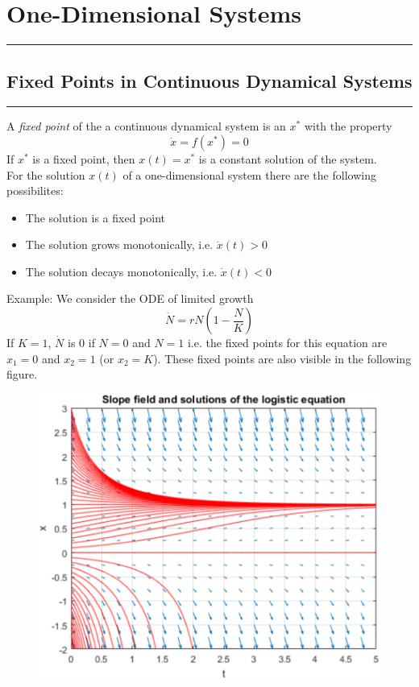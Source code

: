 \section{One-Dimensional Systems}
\noindent\rule[\linienAbstand]{\linewidth}{\linienDickeDick}

\subsection{Fixed Points in Continuous Dynamical Systems}
\noindent\rule[\linienAbstand]{\linewidth}{\linienDicke}
A \emph{fixed point} of the a continuous dynamical system is an $x^*$ with the property
\begin{equation}
  \dot{x} = f(x^*) = 0
\end{equation}
If $x^*$ is a fixed point, then $x(t) = x^*$ is a constant solution of the system.\\

For the solution $x(t)$ of a one-dimensional system there are the following possibilites:
\begin{itemize}
  \item The solution is a fixed point
  \item The solution grows monotonically, i.e. $\dot{x}(t) > 0$
  \item The solution decays monotonically, i.e. $\dot{x}(t) < 0$
\end{itemize}

Example: We consider the ODE of limited growth
\begin{equation}
  \dot{N} = rN\left(1-\frac{N}{K}\right)
\end{equation}
If $K = 1$, $\dot{N}$ is $0$ if $N = 0$ and $N = 1$ i.e. the fixed points for this equation are $x_1 = 0$ and $x_2 = 1$ (or $x_2 = K$). These fixed points are also visible in the following figure.

\begin{figure}[H]
  \centering
  \includegraphics[width=.7\linewidth]{Pics/4.2.png}
\end{figure}

